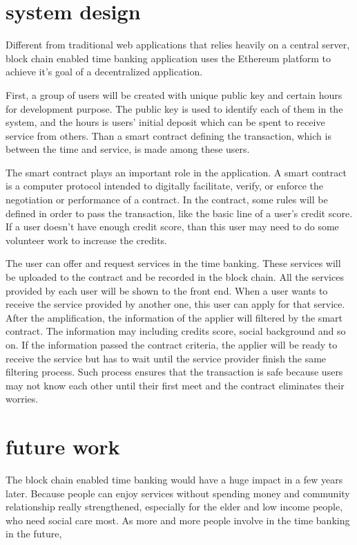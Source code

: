 \documentclass[conference]{IEEEtran}
\begin{document}
\section{system design}
 Different from traditional web applications that relies heavily on a central server, block chain enabled time banking application uses the Ethereum platform to achieve it's goal of a decentralized application. 

 First, a group of users will be created with unique public key and certain hours for development purpose. The public key is used to identify each of them in the system, and the hours is users' initial deposit which can be spent to receive service from others.  Than a smart contract defining the transaction, which is between the time and service, is made among these users. 
 
 The smart contract plays an important role in the application. A smart contract is a computer protocol intended to digitally facilitate, verify, or enforce the negotiation or performance of a contract.\cite{wiki} In the contract, some rules will be defined in order to pass the transaction, like the basic line of a user's credit score. If a user doesn't have enough credit score, than this user may need to do some volunteer work to increase the credits.   
 
The user can offer and request services in the time banking. These services will be uploaded to the contract and be recorded in the block chain. All the services provided by each user will be shown to the front end. When a user wants to receive the service provided by another one, this user can apply for that service. After the amplification, the information of the applier will filtered by the smart contract. The information may including credits score, social background and so on. If the information passed the contract criteria, the applier will be ready to receive the service but has to wait until the service provider finish the same filtering process. Such process ensures that the transaction is safe because users may not know each other until their first meet and the contract eliminates their worries.

\section{future work}
The block chain enabled time banking would have a huge impact in a few years later. Because people can enjoy services without spending money and community relationship really strengthened, especially for the elder and low income people, who need social care most. As more and more people involve in the time banking in the future,   


 


\end{document}
